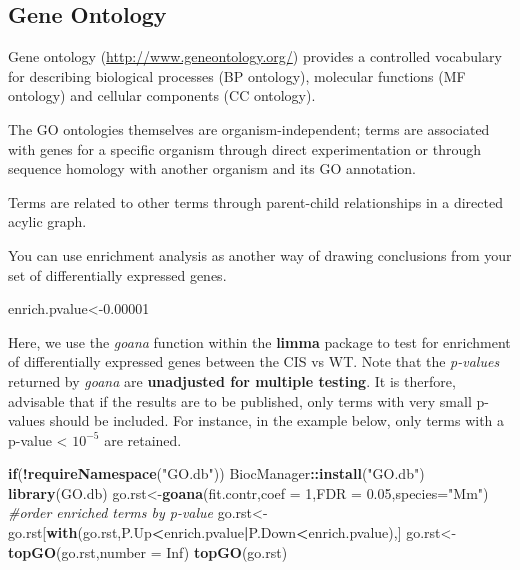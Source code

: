 \documentclass[]{book}
\newenvironment{Shaded}{\begin{snugshade}}{\end{snugshade}}
\newcommand{\CommentTok}[1]{\textcolor[rgb]{0.56,0.35,0.01}{\textit{#1}}}
\newcommand{\ControlFlowTok}[1]{\textcolor[rgb]{0.13,0.29,0.53}{\textbf{#1}}}
\newcommand{\DataTypeTok}[1]{\textcolor[rgb]{0.13,0.29,0.53}{#1}}
\newcommand{\DecValTok}[1]{\textcolor[rgb]{0.00,0.00,0.81}{#1}}
\newcommand{\FloatTok}[1]{\textcolor[rgb]{0.00,0.00,0.81}{#1}}
\newcommand{\KeywordTok}[1]{\textcolor[rgb]{0.13,0.29,0.53}{\textbf{#1}}}
\newcommand{\NormalTok}[1]{#1}
\newcommand{\OperatorTok}[1]{\textcolor[rgb]{0.81,0.36,0.00}{\textbf{#1}}}
\newcommand{\OtherTok}[1]{\textcolor[rgb]{0.56,0.35,0.01}{#1}}
\newcommand{\StringTok}[1]{\textcolor[rgb]{0.31,0.60,0.02}{#1}}
\begin{document}
\hypertarget{gene-ontology}{%
\subsection{Gene Ontology}\label{gene-ontology}}

Gene ontology (\url{http://www.geneontology.org/}) provides a controlled vocabulary for describing biological processes (BP ontology), molecular functions (MF ontology) and cellular components (CC ontology).

The GO ontologies themselves are organism-independent; terms are associated with genes for a specific organism through direct experimentation or through sequence homology with another organism and its GO annotation.

Terms are related to other terms through parent-child relationships in a directed acylic graph.

You can use enrichment analysis as another way of drawing conclusions from your set of differentially expressed genes.

\begin{Shaded}
\begin{Highlighting}[]
\NormalTok{enrich.pvalue<-}\FloatTok{0.00001}
\end{Highlighting}
\end{Shaded}

Here, we use the \emph{goana} function within the \textbf{limma} package to test for enrichment of differentially expressed genes between the CIS vs WT. Note that the \emph{p-values} returned by \emph{goana} are \textbf{unadjusted for multiple testing}. It is therfore, advisable that if the results are to be published, only terms with very small p-values should be included. For instance, in the example below, only terms with a p-value \textless{} \ensuremath{10^{-5}} are retained.

\begin{Shaded}
\begin{Highlighting}[]
\ControlFlowTok{if}\NormalTok{(}\OperatorTok{!}\KeywordTok{requireNamespace}\NormalTok{(}\StringTok{"GO.db"}\NormalTok{))}
\NormalTok{  BiocManager}\OperatorTok{::}\KeywordTok{install}\NormalTok{(}\StringTok{"GO.db"}\NormalTok{)}
\KeywordTok{library}\NormalTok{(GO.db)}
\NormalTok{go.rst<-}\KeywordTok{goana}\NormalTok{(fit.contr,}\DataTypeTok{coef =} \DecValTok{1}\NormalTok{,}\DataTypeTok{FDR =} \FloatTok{0.05}\NormalTok{,}\DataTypeTok{species=}\StringTok{"Mm"}\NormalTok{)}
\CommentTok{#order enriched terms by p-value}
\NormalTok{go.rst<-go.rst[}\KeywordTok{with}\NormalTok{(go.rst,P.Up}\OperatorTok{<}\NormalTok{enrich.pvalue}\OperatorTok{|}\NormalTok{P.Down}\OperatorTok{<}\NormalTok{enrich.pvalue),]}
\NormalTok{go.rst<-}\KeywordTok{topGO}\NormalTok{(go.rst,}\DataTypeTok{number =} \OtherTok{Inf}\NormalTok{)}
\KeywordTok{topGO}\NormalTok{(go.rst)}
\end{Highlighting}
\end{Shaded}
\end{document}
